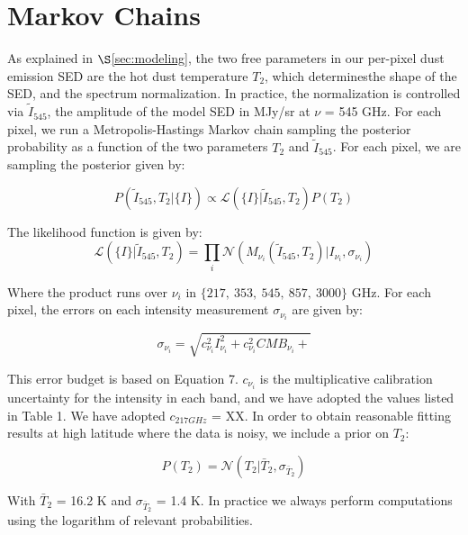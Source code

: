 \documentclass{emulateapj}
\begin{document}
\section{Markov Chains}
As explained in $\S$\ref{sec:modeling}, the two free parameters in our 
per-pixel dust emission SED are the hot dust temperature $T_2$, which 
determinesthe shape of the SED, and the spectrum normalization. In practice,
the normalization is controlled via $\tilde{I}_{545}$, the amplitude of the 
model SED in MJy/sr at $\nu$ = 545 GHz. For each pixel, we run a 
Metropolis-Hastings Markov chain sampling the posterior probability as a 
function of the two parameters $T_2$ and $\tilde{I}_{545}$. For each pixel, we 
are sampling the posterior given by:

\begin{equation}
P(\tilde{I}_{545}, T_2|\{I\}) \propto \mathcal{L}(\{I\}|\tilde{I}_{545}, T_2)P(T_2)
\end{equation}

The likelihood function is given by:
\begin{equation}
\mathcal{L}(\{I\}|\tilde{I}_{545}, T_2) = \displaystyle\prod\limits_{i}\mathcal{N}(M_{\nu_{i}}(\tilde{I}_{545}, T_2)|I_{\nu_{i}}, \sigma_{\nu_i})
\end{equation}


Where the product runs over $\nu_i$ in $\{217,\ 353,\ 545,\ 857,\ 3000\}$ GHz. 
For each pixel, the errors on each intensity measurement $\sigma_{\nu_i}$ are 
given by:

\begin{equation}
\sigma_{\nu_i} = \sqrt{c^2_{\nu_i}I^2_{\nu_i} + c^2_{\nu_i}CMB_{\nu_i} + }
\end{equation}

This error budget is based on \cite{planckdust} Equation 7. $c_{\nu_i}$ is the 
multiplicative calibration uncertainty for the intensity in each band, and we 
have adopted the values listed in \cite{planckdust} Table 1. We have adopted 
$c_{217 GHz}$ = XX. In order to obtain reasonable fitting results at high 
latitude where the data is noisy, we include a prior on $T_2$:

\begin{equation}
P(T_2) = \mathcal{N}(T_2|\bar{T}_2, \sigma_{\bar{T}_2})
\end{equation}

With $\bar{T}_2$ = 16.2 K and $\sigma_{\bar{T}_2}$ = 1.4 K. In practice we 
always perform computations using the logarithm of relevant probabilities.
\end{document}
